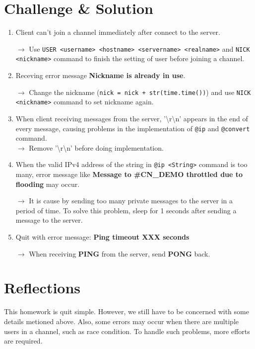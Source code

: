 \documentclass[12t, a4paper]{article}
\begin{document}
\begin{CJK}{UTF8}{bkai}
	\section*{Challenge \& Solution}
		\begin{enumerate}
		\item
			Client can't join a channel immediately after connect to the server. \par
			$\rightarrow$ Use \texttt{USER <username> <hostname> <servername> <realname>} and \texttt{NICK <nickname>} command to finish the setting of user before joining a channel.
		\item 
			Receving error message {\bf Nickname is already in use}. \par
			$\rightarrow$ Change the nickname (\texttt{nick = nick + str(time.time())}) and use \texttt{NICK <nickname>} command to set nickname again.
		\item
			When client receiving messages from the server, '\textbackslash r\textbackslash n' appears in the end of every message, causing problems in the implementation of \texttt{@ip} and \texttt{@convert} command.\\
			$\rightarrow$ Remove '\textbackslash r\textbackslash n' before doing implementation.
		\item
			When the valid IPv4 address of the string in \texttt{@ip <String>} command is too many, error message like {\bf Message to \#CN\_DEMO throttled due to flooding} may occur.\par
			$\rightarrow$ It is cause by sending too many private messages to the server in a period of time. To solve this problem, sleep for 1 seconds after sending a message to the server.
		\item
			Quit with error message: {\bf Ping timeout XXX seconds} \par
			$\rightarrow$ When receiving {\bf PING} from the server, send {\bf PONG} back.
		\end{enumerate}
		
	\section*{Reflections}
		This homework is quit simple. However, we still have to be concerned with some details metioned above. Also, some errors may occur when there are multiple users in a channel, such as race condition. To handle such problems, more efforts are required.
		
	
	\clearpage
	\end{CJK}
\end{document}
